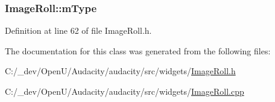 \subsubsection[{\texorpdfstring{m\+Type}{mType}}]{ Image\+Roll\+::m\+Type\hspace{0.3cm}{\ttfamily [protected]}}\hypertarget{class_image_roll_ae09d3c9bff4cf0bb47d623ac427c9fb4}{}\label{class_image_roll_ae09d3c9bff4cf0bb47d623ac427c9fb4}


Definition at line 62 of file Image\+Roll.\+h.



The documentation for this class was generated from the following files\+:\begin{DoxyCompactItemize}
\item 
C\+:/\+\_\+dev/\+Open\+U/\+Audacity/audacity/src/widgets/\hyperlink{_image_roll_8h}{Image\+Roll.\+h}\item 
C\+:/\+\_\+dev/\+Open\+U/\+Audacity/audacity/src/widgets/\hyperlink{_image_roll_8cpp}{Image\+Roll.\+cpp}\end{DoxyCompactItemize}
